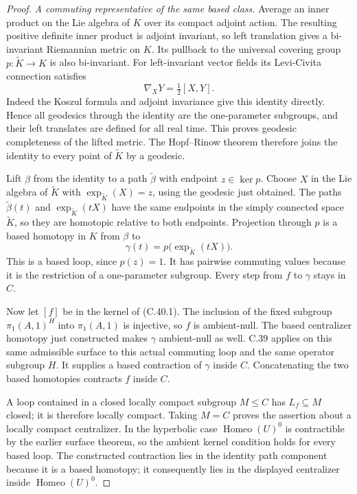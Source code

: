 \begin{proof}
\emph{A commuting representative of the same based class.}
Average an inner product on the Lie algebra of $K$
over its compact adjoint action. The resulting
positive definite inner product is adjoint
invariant, so left translation gives a bi-invariant
Riemannian metric on $K$. Its pullback to the
universal covering group
$p:\widetilde K\to K$ is also bi-invariant.
For left-invariant vector fields its Levi-Civita
connection satisfies
\[
               \nabla_XY=\tfrac12[X,Y].
                                                        \tag{C.40.5}
\]
Indeed the Koszul formula and adjoint invariance
give this identity directly. Hence all geodesics
through the identity are the one-parameter
subgroups, and their left translates are defined
for all real time. This proves geodesic completeness
of the lifted metric. The Hopf--Rinow theorem
therefore joins the identity to every point of
$\widetilde K$ by a geodesic.

Lift $\beta$ from the identity to a path
$\widetilde\beta$ with endpoint $z\in\ker p$.
Choose $X$ in the Lie algebra of $\widetilde K$
with $\exp_{\widetilde K}(X)=z$, using the geodesic
just obtained. The paths $\widetilde\beta(t)$
and $\exp_{\widetilde K}(tX)$ have the same
endpoints in the simply connected space
$\widetilde K$, so they are homotopic relative
to both endpoints. Projection through $p$ is a
based homotopy in $K$ from $\beta$ to
\[
             \gamma(t)=p\bigl(\exp_{\widetilde K}(tX)\bigr).
                                                        \tag{C.40.6}
\]
This is a based loop, since $p(z)=1$.
It has pairwise commuting values because it is
the restriction of a one-parameter subgroup.
Every step from $f$ to $\gamma$ stays in $C$.

Now let $[f]$ be in the kernel of (C.40.1).
The inclusion of the fixed subgroup
$\pi_1(A,1)^H$ into $\pi_1(A,1)$ is injective,
so $f$ is ambient-null. The based centralizer
homotopy just constructed makes $\gamma$
ambient-null as well. C.39 applies on this
same admissible surface to this actual commuting
loop and the same operator subgroup $H$.
It supplies a based contraction of $\gamma$
inside $C$. Concatenating the two based
homotopies contracts $f$ inside $C$.

A loop contained in a closed locally compact
subgroup $M\leq C$ has $L_f\subseteq M$ closed;
it is therefore locally compact. Taking $M=C$
proves the assertion about a locally compact
centralizer. In the hyperbolic case
$\operatorname{Homeo}(U)^0$ is contractible by
the earlier surface theorem, so the ambient
kernel condition holds for every based loop.
The constructed contraction lies in the identity
path component because it is a based homotopy;
it consequently lies in the displayed
centralizer inside $\operatorname{Homeo}(U)^0$.
\end{proof}

